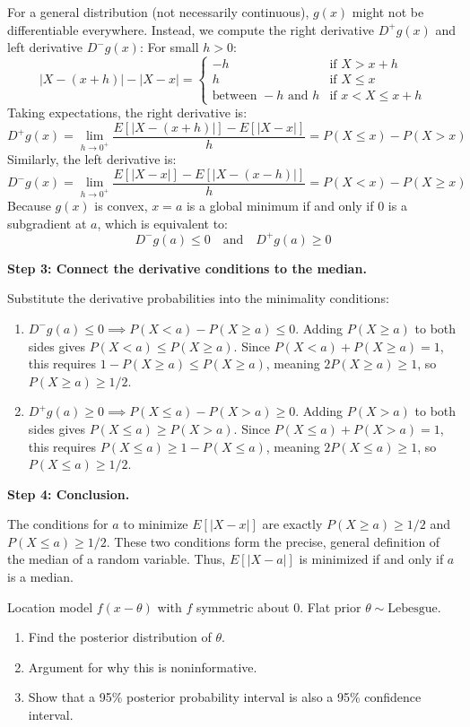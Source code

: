 \begin{solution}
For a general distribution (not necessarily continuous), $g(x)$ might not be differentiable everywhere. Instead, we compute the right derivative $D^+ g(x)$ and left derivative $D^- g(x)$:
For small $h > 0$:
\[ |X - (x+h)| - |X - x| = \begin{cases} -h & \text{if } X > x+h \\ h & \text{if } X \leq x \\ \text{between } -h \text{ and } h & \text{if } x < X \leq x+h \end{cases} \]
Taking expectations, the right derivative is:
\[ D^+ g(x) = \lim_{h \to 0^+} \frac{E[|X-(x+h)|] - E[|X-x|]}{h} = P(X \leq x) - P(X > x) \]
Similarly, the left derivative is:
\[ D^- g(x) = \lim_{h \to 0^+} \frac{E[|X-x|] - E[|X-(x-h)|]}{h} = P(X < x) - P(X \geq x) \]
Because $g(x)$ is convex, $x=a$ is a global minimum if and only if 0 is a subgradient at $a$, which is equivalent to:
\[ D^- g(a) \leq 0 \quad \text{and} \quad D^+ g(a) \geq 0 \]

\textbf{Step 3: Connect the derivative conditions to the median.}

Substitute the derivative probabilities into the minimality conditions:
\begin{enumerate}
    \item $D^- g(a) \leq 0 \implies P(X < a) - P(X \geq a) \leq 0$.
       Adding $P(X \geq a)$ to both sides gives $P(X < a) \leq P(X \geq a)$.
       Since $P(X < a) + P(X \geq a) = 1$, this requires $1 - P(X \geq a) \leq P(X \geq a)$, meaning $2P(X \geq a) \geq 1$, so $P(X \geq a) \geq 1/2$.
    \item $D^+ g(a) \geq 0 \implies P(X \leq a) - P(X > a) \geq 0$.
       Adding $P(X > a)$ to both sides gives $P(X \leq a) \geq P(X > a)$.
       Since $P(X \leq a) + P(X > a) = 1$, this requires $P(X \leq a) \geq 1 - P(X \leq a)$, meaning $2P(X \leq a) \geq 1$, so $P(X \leq a) \geq 1/2$.
\end{enumerate}
\textbf{Step 4: Conclusion.}

The conditions for $a$ to minimize $E[|X-x|]$ are exactly $P(X \geq a) \geq 1/2$ and $P(X \leq a) \geq 1/2$.
These two conditions form the precise, general definition of the median of a random variable. Thus, $E[|X-a|]$ is minimized if and only if $a$ is a median.
\end{solution}

\begin{exercise}\label{probability:2011:9}
Location model $f(x-\theta)$ with $f$ symmetric about 0. Flat prior $\theta \sim \text{Lebesgue}$.
\begin{enumerate}
    \item Find the posterior distribution of $\theta$.
    \item Argument for why this is noninformative.
    \item Show that a 95\% posterior probability interval is also a 95\% confidence interval.
\end{enumerate}
\end{exercise}

